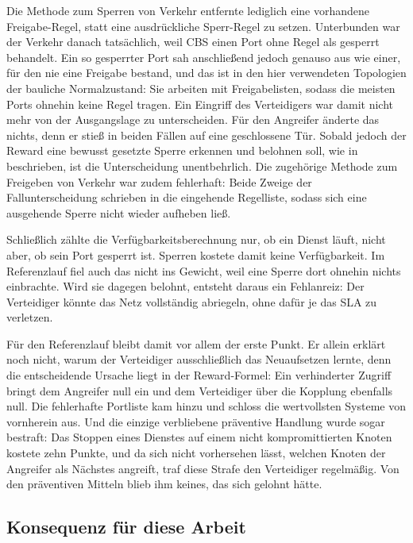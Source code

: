 Die Methode zum Sperren von Verkehr entfernte lediglich eine vorhandene
Freigabe-Regel, statt eine ausdrückliche Sperr-Regel zu setzen. Unterbunden war
der Verkehr danach tatsächlich, weil \ac{CBS} einen Port ohne Regel als gesperrt
behandelt. Ein so gesperrter Port sah anschließend jedoch genauso aus wie einer,
für den nie eine Freigabe bestand, und das ist in den hier verwendeten
Topologien der bauliche Normalzustand: Sie arbeiten mit Freigabelisten, sodass
die meisten Ports ohnehin keine Regel tragen. Ein Eingriff des Verteidigers war
damit nicht mehr von der Ausgangslage zu unterscheiden. Für den Angreifer
änderte das nichts, denn er stieß in beiden Fällen auf eine geschlossene Tür.
Sobald jedoch der Reward eine bewusst gesetzte Sperre erkennen und belohnen
soll, wie in  beschrieben, ist die Unterscheidung
unentbehrlich. Die zugehörige Methode zum Freigeben von Verkehr war zudem
fehlerhaft: Beide Zweige der Fallunterscheidung schrieben in die eingehende
Regelliste, sodass sich eine ausgehende Sperre nicht wieder aufheben ließ.

Schließlich zählte die Verfügbarkeitsberechnung nur, ob ein Dienst läuft, nicht
aber, ob sein Port gesperrt ist. Sperren kostete damit keine Verfügbarkeit. Im
Referenzlauf fiel auch das nicht ins Gewicht, weil eine Sperre dort ohnehin
nichts einbrachte. Wird sie dagegen belohnt, entsteht daraus ein Fehlanreiz:
Der Verteidiger könnte das Netz vollständig abriegeln, ohne dafür je das
\ac{SLA} zu verletzen.

Für den Referenzlauf bleibt damit vor allem der erste Punkt. Er allein erklärt
noch nicht, warum der Verteidiger ausschließlich das Neuaufsetzen lernte, denn
die entscheidende Ursache liegt in der Reward-Formel: Ein verhinderter Zugriff
bringt dem Angreifer null ein und dem Verteidiger über die Kopplung ebenfalls
null. Die fehlerhafte Portliste kam hinzu und schloss die wertvollsten Systeme
von vornherein aus. Und die einzige verbliebene präventive Handlung wurde sogar
bestraft: Das Stoppen eines Dienstes auf einem nicht kompromittierten Knoten
kostete zehn Punkte, und da sich nicht vorhersehen lässt, welchen Knoten der
Angreifer als Nächstes angreift, traf diese Strafe den Verteidiger regelmäßig.
Von den präventiven Mitteln blieb ihm keines, das sich gelohnt hätte.

\subsection{Konsequenz für diese Arbeit}
\label{sec:konsequenz}

